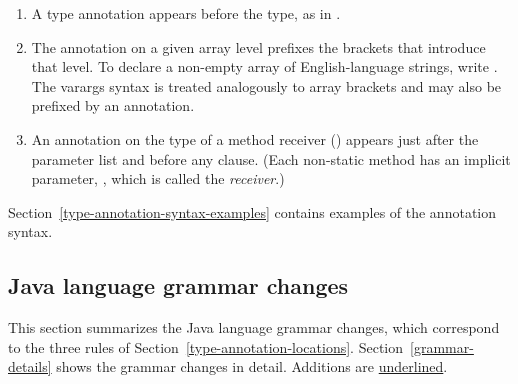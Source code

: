 \documentclass[10pt]{article}
\begin{document}
\begin{enumerate}
\item
  A type annotation appears before the type, as in .
\item
  The annotation on a given array level
  prefixes the brackets that introduce that level.  To declare
  a non-empty array of English-language strings, write .
  The varargs syntax  is treated analogously to array brackets
  and may also be prefixed by an annotation.
\item
  An annotation on the type of a method receiver () appears
  just after the parameter list and before any  clause.
  (Each non-static method has an implicit parameter, , which is
  called the \emph{receiver}.)
\end{enumerate}

Section~\ref{type-annotation-syntax-examples} contains examples of the annotation syntax.


\subsection{Java language grammar changes\label{grammar-summary}}



This section
summarizes the Java language grammar changes, which correspond to
the three rules of Section~\ref{type-annotation-locations}.
Section~\ref{grammar-details} shows the grammar changes in detail.
Additions are \underline{underlined}.



\newcommand{\term}[1]{\code{#1}}         %
\newcommand{\nt}[1]{\emph{#1}}           %
\newcommand{\opt}[1]{\emph{[}#1\emph{]}} %
\newcommand{\multi}[1]{\emph{\{}#1\emph{\}}} %
\newcommand{\alt}[1]{\emph{(}#1\emph{)}} %
\newcommand{\altor}[1]{\ensuremath{\mathit{|}}} %
\newcommand{\new}[1]{\underline{#1}}     %
\end{document}
